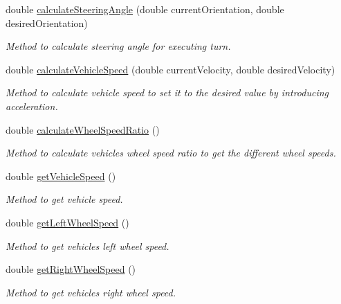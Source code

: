\begin{DoxyCompactItemize}
\item 
double \mbox{\hyperlink{classController_a9faf85b1601c9c20740cb31ce3a9f099}{calculate\+Steering\+Angle}} (double current\+Orientation, double desired\+Orientation)
\begin{DoxyCompactList}\small\item\em Method to calculate steering angle for executing turn. \end{DoxyCompactList}\item 
double \mbox{\hyperlink{classController_a4c6ff34160fced40226456f39b97804f}{calculate\+Vehicle\+Speed}} (double current\+Velocity, double desired\+Velocity)
\begin{DoxyCompactList}\small\item\em Method to calculate vehicle speed to set it to the desired value by introducing acceleration. \end{DoxyCompactList}\item 
double \mbox{\hyperlink{classController_a2505ab26434dd301abbcb32ba4f75f0a}{calculate\+Wheel\+Speed\+Ratio}} ()
\begin{DoxyCompactList}\small\item\em Method to calculate vehicle\textquotesingle{}s wheel speed ratio to get the different wheel speeds. \end{DoxyCompactList}\item 
double \mbox{\hyperlink{classController_ae20b7417457e0be22da044b3ce4ecc3f}{get\+Vehicle\+Speed}} ()
\begin{DoxyCompactList}\small\item\em Method to get vehicle speed. \end{DoxyCompactList}\item 
double \mbox{\hyperlink{classController_ad9d6fbcc6ba76e33050291ae2327e301}{get\+Left\+Wheel\+Speed}} ()
\begin{DoxyCompactList}\small\item\em Method to get vehicle\textquotesingle{}s left wheel speed. \end{DoxyCompactList}\item 
double \mbox{\hyperlink{classController_ad50ec21787d1ac38c6ad8c8086384b22}{get\+Right\+Wheel\+Speed}} ()
\begin{DoxyCompactList}\small\item\em Method to get vehicle\textquotesingle{}s right wheel speed. \end{DoxyCompactList}\item 

\end{DoxyCompactItemize}
